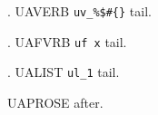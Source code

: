 \documentclass{article}
\begin{document}
\ex. UAVERB \verb|uv_%$#{}| tail.

\ex. UAFVRB \Verb*|uf x| tail.

\ex. UALIST \lstinline[basicstyle={\ttfamily}]{ul_1} tail.

UAPROSE after.
\end{document}
